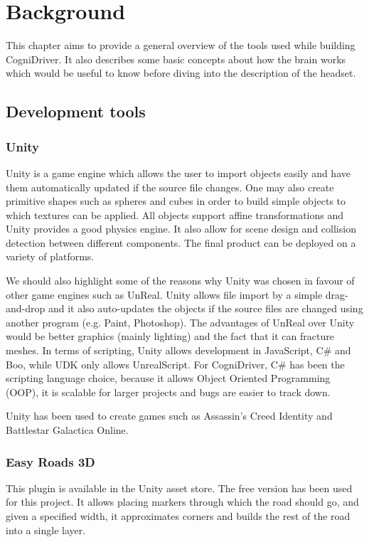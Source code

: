\chapter{Background}
\label{cha:background}

This chapter aims to provide a general overview of the tools used while building CogniDriver. It also describes some basic concepts about how the brain works which would be useful to know before diving into the description of the headset. 

\section{Development tools}

\subsection{Unity}
Unity is a game engine which allows the user to import objects easily and have them automatically updated if the source file changes. One may also create primitive shapes such as spheres and cubes in order to build simple objects to which textures can be applied. All objects support affine transformations and Unity provides a good physics engine. It also allow for scene design and collision detection between different components. The final product can be deployed on a variety of platforms.

We should also highlight some of the reasons why Unity was chosen in favour of other game engines such as UnReal. Unity allows file import by a simple drag-and-drop and it also auto-updates the objects if the source files are changed using another program (e.g. Paint, Photoshop). The advantages of UnReal over Unity would be better graphics (mainly lighting) and the fact that it can fracture meshes. In terms of scripting, Unity allows development in JavaScript, C\# and Boo, while UDK only allows UnrealScript. For CogniDriver, C\# has been the scripting language choice, because it allows Object Oriented Programming (OOP), it is scalable for larger projects and bugs are easier to track down. 

Unity has been used to create games such as Assassin's Creed Identity \cite{assassins} and Battlestar Galactica Online\cite{battlestar}.

\subsection{Easy Roads 3D}
This plugin is available in the Unity asset store. The free version has been used for this project. It allows placing markers through which the road should go, and given a specified width, it approximates corners and builds the rest of the road into a single layer.

